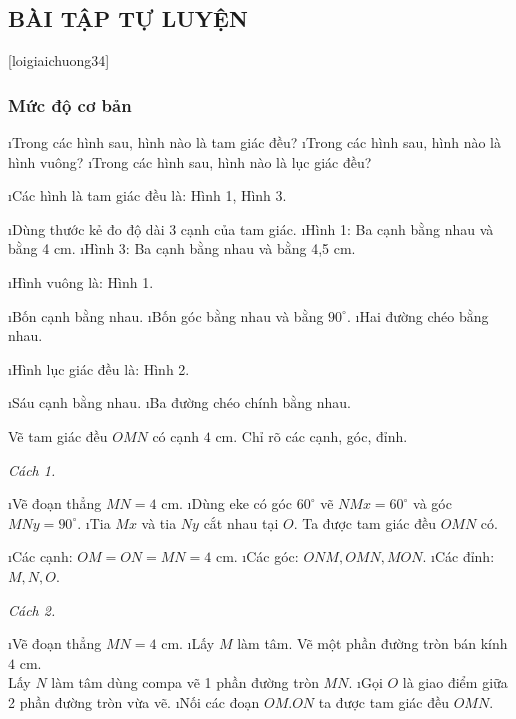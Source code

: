 \subsection{BÀI TẬP TỰ LUYỆN}
[loigiaichuong34]
\subsubsection{Mức độ cơ bản}
\begin{bt}
	\begin{enumerate}[a), leftmargin=*]
		\i Trong các hình sau, hình nào là tam giác đều? 
		\i Trong các hình sau, hình nào là hình vuông? 
		\i Trong các hình sau, hình nào là lục giác đều?
	\end{enumerate}
	\begin{loigiaichuong34}
		\begin{enumerate}[a), leftmargin=*]
			\i Các hình là tam giác đều là: Hình 1, Hình 3.
			\begin{enumerate}[--, leftmargin=*]
				\i Dùng thước kẻ đo độ dài 3 cạnh của tam giác.
				\i Hình 1: Ba cạnh bằng nhau và bằng 4 cm.
				\i Hình 3: Ba cạnh bằng nhau và bằng 4,5 cm.
			\end{enumerate}
			\i Hình vuông là: Hình 1.
			\begin{enumerate}[--, leftmargin=*]
				\i Bốn cạnh bằng nhau.
				\i Bốn góc bằng nhau và bằng $90^\circ$.
				\i Hai đường chéo bằng nhau.
			\end{enumerate}
			\i Hình lục giác đều là: Hình 2.
			\begin{enumerate}[--, leftmargin=*]
				\i Sáu cạnh bằng nhau.
				\i Ba đường chéo chính bằng nhau.
			\end{enumerate}
		\end{enumerate}
	\end{loigiaichuong34}
\end{bt}
\begin{bt}
	Vẽ tam giác đều $OMN$ có cạnh $4$ cm. Chỉ rõ các cạnh, góc, đỉnh.
	\begin{loigiaichuong34}
		\textit{Cách 1.}
		\begin{enumerate}[Bước 1:, leftmargin=*]
			\i Vẽ đoạn thẳng $MN =4$ cm.
			\i Dùng eke có góc $60^\circ$ vẽ $NMx = 60^\circ$ và góc  $MNy = 90^\circ$.
			\i Tia $Mx$ và tia $Ny$ cắt nhau tại $O$.
			Ta được tam giác đều $OMN$ có. 
			\begin{enumerate}[+, leftmargin=*]
				\i Các cạnh:  $OM = ON = MN = 4$ cm.
				\i Các góc:  $ONM, OMN, MON$.
				\i Các đỉnh: $M, N, O$.
			\end{enumerate}
		\end{enumerate}
		\textit{Cách 2.}
		\begin{enumerate}[Bước 1:, leftmargin=*]
			\i Vẽ đoạn thẳng  $MN = 4$ cm.
			\i Lấy $M$ làm tâm. Vẽ một phần đường tròn bán kính  $4$ cm.\\
			 Lấy $N$ làm tâm dùng compa vẽ 1 phần đường tròn $MN$.
			\i Gọi $O$ là giao điểm giữa 2 phần đường tròn vừa vẽ.
			\i Nối các đoạn $OM. ON$ ta được tam giác đều $OMN$.
		\end{enumerate}
	\end{loigiaichuong34}
\end{bt}
